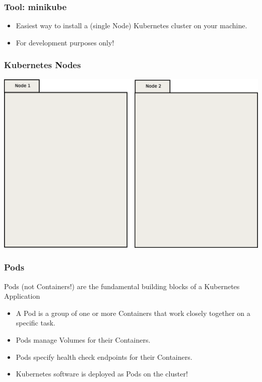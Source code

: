 \begin{frame}
    \frametitle{Tool: minikube\footnotemark}
    \begin{itemize}
        \item Easiest way to install a (single Node) Kubernetes cluster on your machine.
        \item For development purposes only!
    \end{itemize}
\end{frame}

\begin{frame}
    \frametitle{Kubernetes Nodes}
    \includegraphics[width=\textwidth,height=0.85\textheight,keepaspectratio]{graphics/00-nodes.eps}
\end{frame}

\begin{frame}
    \frametitle{Pods}
    Pods (not Containers!) are the fundamental building blocks of a Kubernetes Application\pause
    \begin{itemize}
        \item A Pod is a group of one or more Containers that work closely together on a specific task.\pause
        \item Pods manage Volumes for their Containers.\pause
        \item Pods specify health check endpoints for their Containers.\pause
        \item Kubernetes software is deployed as Pods on the cluster!
    \end{itemize}
\end{frame}

